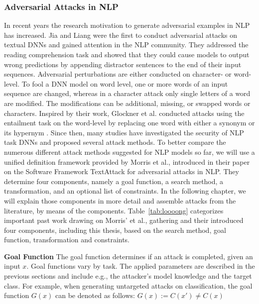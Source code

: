 
\subsubsection{Adversarial Attacks in NLP}
\label{sec:adv-ex_in_NLP}

In recent years the research motivation to generate adversarial examples in NLP has increased. Jia and Liang were the first to conduct adversarial attacks on textual DNNs and gained attention in the NLP community\cite{Jia2017AdversarialEF}. They addressed the reading comprehension task and showed that they could cause models to output wrong predictions by appending distractor sentences to the end of their input sequences.
Adversarial perturbations are either conducted on character- or word-level. To fool a DNN model on word level, one or more words of an input sequence are changed, whereas in a character attack only single letters of a word are modified. The modifications can be additional, missing, or swapped words or characters. 
Inspired by their work, Glockner et al. conducted attacks using the entailment task on the word-level by replacing one word with either a synonym or its hypernym \cite{glockner2018breaking}. Since then, many studies have investigated the security of NLP task DNNs and proposed several attack methods. 
To better compare the numerous different attack methods suggested for NLP models so far, we will use a unified definition framework provided by Morris et al., introduced in their paper on the Software Framework TextAttack for adversarial attacks in NLP\cite{morris2020textattack}. They determine four components, namely a goal function, a search method, a transformation, and an optional list of constraints. In the following chapter, we will explain those components in more detail and assemble attacks from the literature, by means of the components.
Table~\ref{tab:loooong} categorizes important past work drawing on Morris' et al., gathering and their introduced four components, including this thesis, based on the search method, goal function, transformation and constraints.

\textbf{Goal Function}
\label{sec:goal_funciton}
The goal function determines if an attack is completed, given an input $x$. 
Goal functions vary by task. The applied parameters are described in the previous sections and include e.g., the attacker's model knowledge and the target class.
For example, when generating untargeted attacks on classification, the goal function $G(x)$ can be denoted as follows:
$G(x):= C(x') \neq C(x)$

